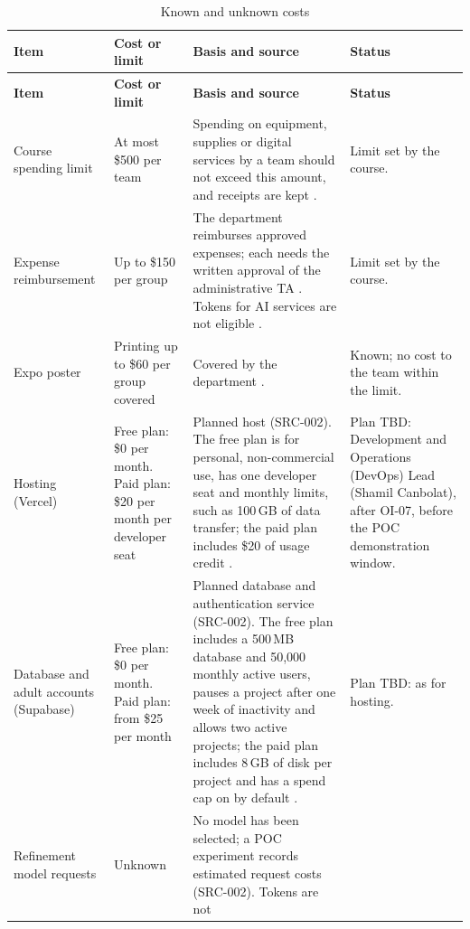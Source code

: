 \documentclass[12pt]{article}
\renewcommand{\_}{\textunderscore\allowbreak}%
\begin{document}
{\small
\begin{longtable}{@{}>{\raggedright\arraybackslash}p{}%
>{\raggedright\arraybackslash}p{}%
>{\raggedright\arraybackslash}p{}%
>{\raggedright\arraybackslash}p{}@{}} \caption{Known and unknown
costs}\label{tab:costs}\\
\toprule
\textbf{Item} & \textbf{Cost or limit} & \textbf{Basis and source} &
\textbf{Status} \\
\midrule
\endfirsthead
\toprule
\textbf{Item} & \textbf{Cost or limit} & \textbf{Basis and source} &
\textbf{Status} \\
\midrule
\endhead
\bottomrule
\endlastfoot
Course spending limit & At most \$500 per team & Spending on equipment, supplies
or digital services by a team should not exceed this amount, and receipts are
kept \citep{Smith2026Outline}. & Limit set by the course. \\
\addlinespace
Expense reimbursement & Up to \$150 per group & The department reimburses
approved expenses; each needs the written approval of the administrative TA
\citep{Smith2026Outline}. Tokens for AI services are not eligible
\citep{Smith2026L02}. & Limit set by the course. \\
\addlinespace
Expo poster & Printing up to \$60 per group covered & Covered by the department
\citep{Smith2026Outline}. & Known; no cost to the team within the limit. \\
\addlinespace
Hosting (Vercel) & Free plan: \$0 per month. Paid plan: \$20 per month per
developer seat & Planned host (SRC-002). The free plan is for personal,
non-commercial use, has one developer seat and monthly limits, such as 100\,GB
of data transfer; the paid plan includes \$20 of usage credit
\citep{Vercel2026Pricing}. & Plan TBD: Development and Operations (DevOps) Lead
(Shamil Canbolat), after OI-07, before the POC demonstration window. \\
\addlinespace
Database and adult accounts (Supabase) & Free plan: \$0 per month. Paid plan:
from \$25 per month & Planned database and authentication service (SRC-002). The
free plan includes a 500\,MB database and 50{,}000 monthly active users, pauses
a project after one week of inactivity and allows two active projects; the paid
plan includes 8\,GB of disk per project and has a spend cap on by default
\citep{Supabase2026Pricing}. & Plan TBD: as for hosting. \\
\addlinespace
Refinement model requests & Unknown & No model has been selected; a POC
experiment records estimated request costs (SRC-002). Tokens are not

\end{longtable}}
\end{document}
